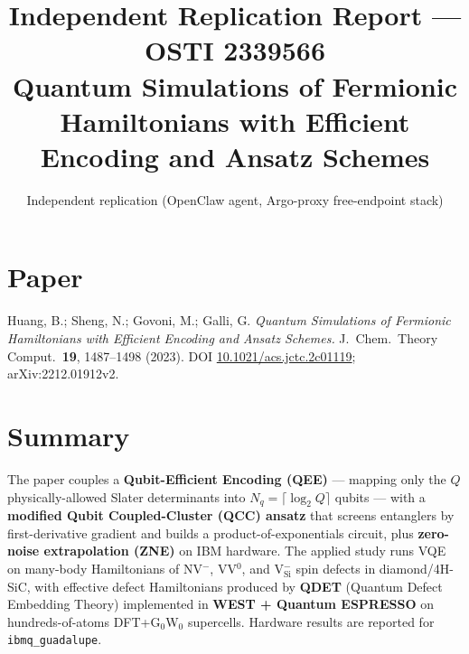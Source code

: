 \documentclass[11pt]{article}
\title{Independent Replication Report --- OSTI 2339566\\
\large Quantum Simulations of Fermionic Hamiltonians with Efficient Encoding and Ansatz Schemes}
\author{Independent replication (OpenClaw agent, Argo-proxy free-endpoint stack)}
\date{}
\begin{document}
\maketitle

\section{Paper}
Huang, B.; Sheng, N.; Govoni, M.; Galli, G. \emph{Quantum Simulations of Fermionic Hamiltonians with Efficient Encoding and Ansatz Schemes.} J.\ Chem.\ Theory Comput.\ \textbf{19}, 1487--1498 (2023). DOI \href{https://doi.org/10.1021/acs.jctc.2c01119}{10.1021/acs.jctc.2c01119}; arXiv:2212.01912v2.

\section{Summary}
The paper couples a \textbf{Qubit-Efficient Encoding (QEE)} --- mapping only the $Q$ physically-allowed Slater determinants into $N_q = \lceil \log_2 Q \rceil$ qubits --- with a \textbf{modified Qubit Coupled-Cluster (QCC) ansatz} that screens entanglers by first-derivative gradient and builds a product-of-exponentials circuit, plus \textbf{zero-noise extrapolation (ZNE)} on IBM hardware. The applied study runs VQE on many-body Hamiltonians of NV$^-$, VV$^0$, and V$^-_{\text{Si}}$ spin defects in diamond/4H-SiC, with effective defect Hamiltonians produced by \textbf{QDET} (Quantum Defect Embedding Theory) implemented in \textbf{WEST + Quantum ESPRESSO} on hundreds-of-atoms DFT+G$_0$W$_0$ supercells. Hardware results are reported for \texttt{ibmq\_guadalupe}.
\end{document}
